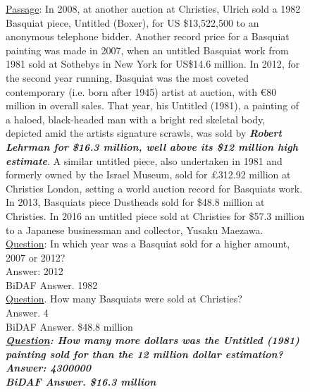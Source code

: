 \documentclass[11pt,a4paper]{article}
\begin{document}
\begin{figure}
\small
{\underline{Passage}: {\color{purple}In 2008, at another auction at Christies, Ulrich sold a 1982 Basquiat piece, Untitled (Boxer)}, for US \$13,522,500 to an anonymous telephone bidder. Another record price for a Basquiat painting was made {\color{olive}in 2007, when an untitled Basquiat work from 1981 sold at Sothebys in New York for US\$14.6 million}. {\color{olive}In 2012}, for the second year running, Basquiat was the most coveted contemporary (i.e. born after 1945) artist at auction, with {\color{olive}\euro 80 million in overall sales}. {\color{olive}That year}, his Untitled (1981), a painting of a haloed, black-headed man with a bright red skeletal body, depicted amid the artists signature scrawls, was  sold by \textbf{\textit{Robert Lehrman for {\color{olive}\$16.3 million}, well above its  \$12 million high estimate}}. A similar untitled piece, also undertaken in 1981 and formerly owned by the Israel Museum, {\color{purple}sold for \pounds312.92 million at Christies} London, setting a world auction record for Basquiats work. In 2013, Basquiats piece {\color{purple}Dustheads sold for \$48.8 million at Christies}. In 2016 an untitled piece sold at {\color{purple}Christies for \$57.3 million to a Japanese businessman} and collector, Yusaku Maezawa.
\\
{\color{olive} \underline{Question}: In which year was a Basquiat sold for a higher amount, 2007 or 2012?\\
    Answer: 2012\\
    BiDAF Answer. 1982
} \\
{\color{purple}
    \underline{Question}. How many Basquiats were sold at Christies?\\
    Answer. 4\\
    BiDAF Answer. \$48.8 million
}\\
\textbf{\textit{ \underline{Question}: How many more dollars was the Untitled (1981) painting sold for than the 12 million dollar estimation?\\
    Answer: 4300000\\
    BiDAF Answer. \$16.3 million
}}
}\\
    

\end{figure}
\end{document}

